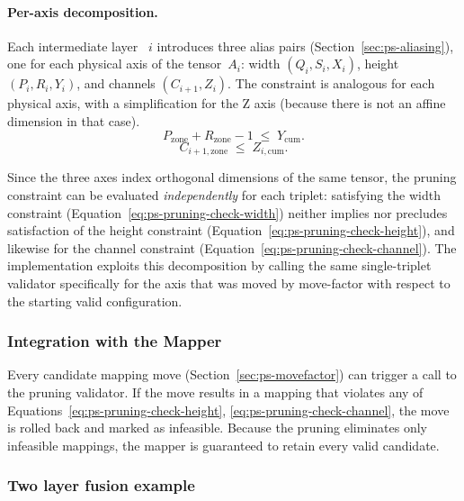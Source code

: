 \paragraph{Per-axis decomposition.}
Each intermediate layer ~$i$ introduces three alias pairs
(Section~\ref{sec:ps-aliasing}), one for each physical axis of the
tensor~$A_i$: width $(Q_i, S_i, X_i)$, height $(P_i, R_i, Y_i)$,
and channels $(C_{i+1}, Z_i)$.
The constraint is analogous for each physical axis, with a simplification for the Z axis (because there is not an affine dimension in that case).
\begin{equation}
\label{eq:ps-pruning-check-height}
  P_{\text{zone}} + R_{\text{zone}} - 1 \;\le\; Y_{\text{cum}}.
\end{equation}
\begin{equation}
\label{eq:ps-pruning-check-channel}
  C_{i+1, \text{zone}} \;\le\; Z_{i, \text{cum}}.
\end{equation}

Since the three axes index orthogonal dimensions of the same tensor, 
the pruning constraint can be evaluated \emph{independently} for each
triplet: satisfying the width constraint
(Equation~\ref{eq:ps-pruning-check-width}) neither implies nor precludes
satisfaction of the height constraint (Equation~\ref{eq:ps-pruning-check-height}), and likewise for the channel
constraint (Equation~\ref{eq:ps-pruning-check-channel}).
The implementation exploits this decomposition by calling the same
single-triplet validator specifically for the axis that was moved by move-factor with respect to the starting valid configuration.


\subsubsection{Integration with the Mapper}

Every candidate mapping move (Section~\ref{sec:ps-movefactor}) can
trigger a call to the pruning validator.
If the move results in a mapping that violates any of
Equations~\ref{eq:ps-pruning-check-height}, \ref{eq:ps-pruning-check-channel},
the move is rolled back and marked as infeasible.
Because the pruning eliminates only infeasible mappings, the mapper
is guaranteed to retain every valid candidate.


\subsubsection{Two layer fusion example}
\label{sec:ps-pruning-example}

